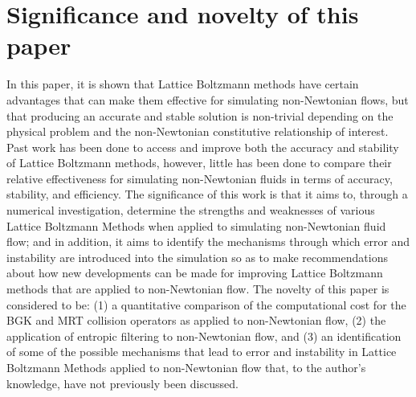 \documentclass{article}
\begin{document}
\section*{Significance and novelty of this paper}

In this paper, it is shown that Lattice Boltzmann methods have certain advantages that can make them effective for simulating non-Newtonian flows, but that producing an accurate and stable solution is non-trivial depending on the physical problem and the non-Newtonian constitutive relationship of interest.
Past work has been done to access and improve both the accuracy and stability of Lattice Boltzmann methods, however, little has been done to compare their relative effectiveness for simulating non-Newtonian fluids in terms of accuracy, stability, and efficiency.
The significance of this work is that it aims to, through a numerical investigation, determine the strengths and weaknesses of various Lattice Boltzmann Methods when applied to simulating non-Newtonian fluid flow; and in addition, it aims to identify the mechanisms through which error and instability are introduced into the simulation so as to make recommendations about how new developments can be made for improving Lattice Boltzmann methods that are applied to non-Newtonian flow.
The novelty of this paper is considered to be: (1) a quantitative comparison of the computational cost for the BGK and MRT collision operators as applied to non-Newtonian flow, (2) the application of entropic filtering to non-Newtonian flow, and (3) an identification of some of the possible mechanisms that lead to error and instability in Lattice Boltzmann Methods applied to non-Newtonian flow that, to the author's knowledge, have not previously been discussed.
\end{document}
